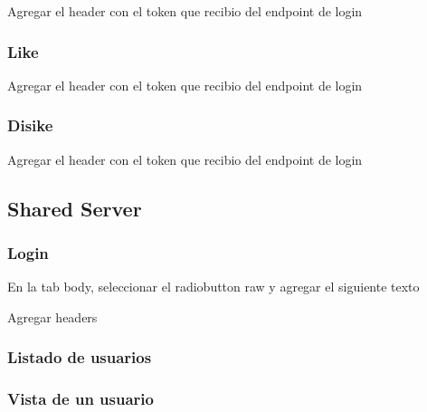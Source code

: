 \documentclass[letterpaper,10pt,english]{sphinxmanual}
\begin{document}
Agregar el header con el token que recibio del endpoint de login



\subsubsection{Like}
\label{manuals:like}

Agregar el header con el token que recibio del endpoint de login



\subsubsection{Disike}
\label{manuals:disike}

Agregar el header con el token que recibio del endpoint de login



\subsection{Shared Server}
\label{manuals:id4}

\subsubsection{Login}
\label{manuals:id5}

En la tab body, seleccionar el radiobutton raw y agregar el siguiente texto


Agregar headers



\subsubsection{Listado de  usuarios}
\label{manuals:id6}


\subsubsection{Vista de un usuario}
\label{manuals:vista-de-un-usuario}
\end{document}
